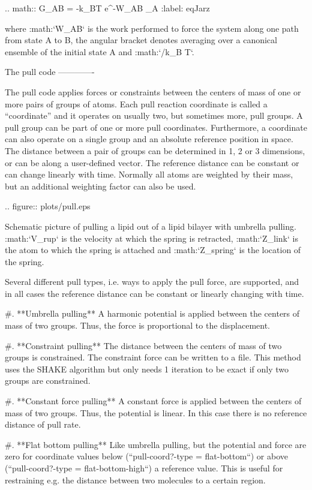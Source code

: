 .. math:: \Delta G_{AB} = -k_BT \log \left\langle e^{-\beta W_{AB}} \right\rangle_A
          :label: eqJarz

where :math:`W_{AB}` is the work performed to force the system along
one path from state A to B, the angular bracket denotes averaging over a
canonical ensemble of the initial state A and :math:`/k_B T`.

The pull code
-------------

The pull code applies forces or
constraints between the centers of mass of one or more pairs of groups
of atoms. Each pull reaction coordinate is called a “coordinate” and it
operates on usually two, but sometimes more, pull groups. A pull group
can be part of one or more pull coordinates. Furthermore, a coordinate
can also operate on a single group and an absolute reference position in
space. The distance between a pair of groups can be determined in 1, 2
or 3 dimensions, or can be along a user-defined vector. The reference
distance can be constant or can change linearly with time. Normally all
atoms are weighted by their mass, but an additional weighting factor can
also be used.

.. figure:: plots/pull.eps

   Schematic picture of pulling a lipid out of a lipid bilayer with
   umbrella pulling. :math:`V_{rup}` is the velocity at which the spring
   is retracted, :math:`Z_{link}` is the atom to which the spring is
   attached and :math:`Z_{spring}` is the location of the spring.

Several different pull types, i.e. ways to apply the pull force, are
supported, and in all cases the reference distance can be constant or
linearly changing with time.

#. **Umbrella pulling**
   A harmonic potential is applied between the centers of mass of two
   groups. Thus, the force is proportional to the displacement.

#. **Constraint pulling**
   The distance between the centers of mass of two groups is
   constrained. The constraint force can be written to a file. This
   method uses the SHAKE algorithm but only needs 1 iteration to be
   exact if only two groups are constrained.

#. **Constant force pulling** A constant force is applied between the
   centers of mass of two groups. Thus, the potential is linear. In this
   case there is no reference distance of pull rate.

#. **Flat bottom pulling** Like umbrella pulling, but the potential and
   force are zero for coordinate values below
   (``pull-coord?-type = flat-bottom``) or above
   (``pull-coord?-type = flat-bottom-high``) a reference
   value. This is useful for restraining e.g. the distance between two
   molecules to a certain region.

